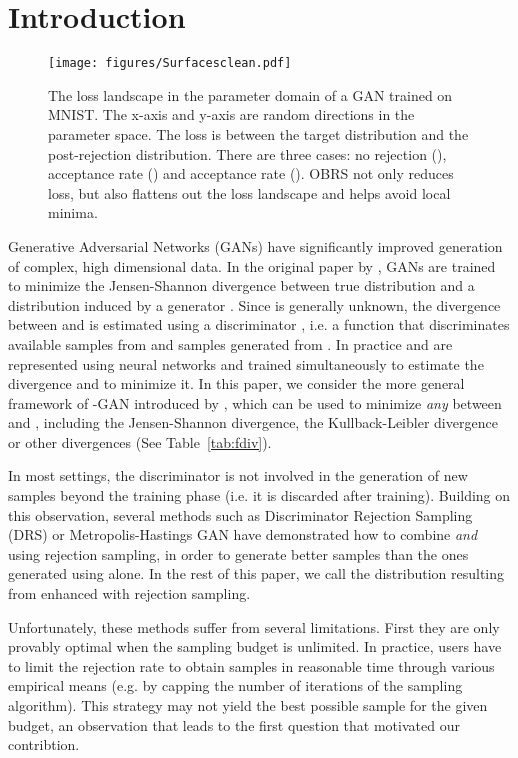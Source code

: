 \documentclass[twoside]{article}
\begin{document}
\section{Introduction}
\begin{figure*}[t]
    \centering
    \texttt{[image: figures/Surfacesclean.pdf]}
    \caption{The loss landscape in the parameter domain of a GAN trained on MNIST. The x-axis and y-axis are random directions in the parameter space. The loss is between the target distribution  and the post-rejection distribution. There are three cases: no rejection (),   acceptance rate () and   acceptance rate (). OBRS not only reduces loss, but also flattens out the loss landscape and helps avoid  local minima.}\label{fig:MNISTSmooth}
\end{figure*}
Generative Adversarial Networks (GANs)  have significantly improved generation of complex, high dimensional data. In the original paper by \citet{goodfellow_generative_2014}, GANs are trained to  minimize the Jensen-Shannon divergence between true distribution  and a distribution  induced by a generator .
Since  is generally unknown, the divergence between  and  is estimated using a discriminator , i.e. a function that discriminates available samples from  and samples generated from . In practice  and  are  represented using neural networks and trained simultaneously to estimate the divergence and to minimize it. In this paper, we consider the more general framework of -GAN introduced by \citet{nowozin_f-gan_2016}, which  can be used to minimize {\em any} \fdiv between  and  , including the Jensen-Shannon divergence, the Kullback-Leibler divergence or other divergences (See Table~\ref{tab:fdiv}).

In most settings, the discriminator is not involved in the generation of new samples beyond the training phase (i.e. it is discarded after training). Building on this observation, several methods  such as  Discriminator Rejection Sampling (DRS) \citep{azadi_discriminator_2019} or Metropolis-Hastings GAN \citep{turner_metropolis-hastings_2019} have demonstrated how to combine  \emph{and}  using rejection sampling, in order to generate better samples than the ones generated using  alone. 
In the rest of this paper, we call  the distribution resulting from  enhanced with rejection sampling.



Unfortunately, these methods suffer from several limitations. First they are only provably optimal when the sampling budget is unlimited. In practice, users have to limit the rejection rate to obtain samples in reasonable time through various empirical means (e.g. by capping the number of iterations of the sampling algorithm). This strategy may not  yield the best possible sample for the given budget, an observation that leads to the first question that motivated our contribtion. 
\end{document}
